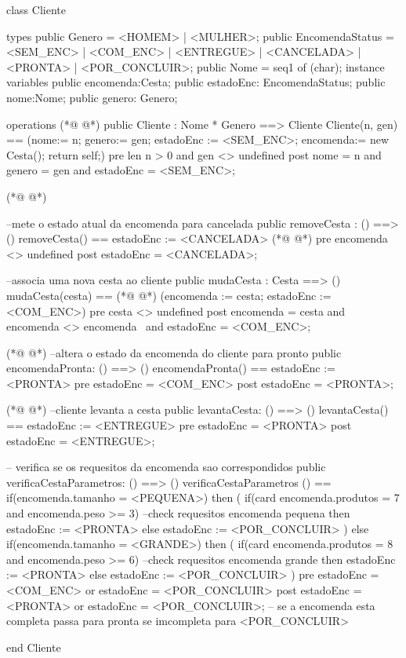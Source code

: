 \begin{vdmpp}[breaklines=true]
class Cliente

types 
 public Genero = <HOMEM> | <MULHER>;
 public EncomendaStatus = <SEM_ENC> | <COM_ENC> | <ENTREGUE> | <CANCELADA> | <PRONTA> | <POR_CONCLUIR>;
 public Nome = seq1 of (char);
instance variables
  public encomenda:Cesta;
  public estadoEnc: EncomendaStatus;
  public nome:Nome;
  public genero: Genero;

operations
(*@
\label{Cliente:14}
@*)
  public  Cliente : Nome * Genero ==> Cliente
  Cliente(n, gen) == (nome:= n; genero:= gen; estadoEnc := <SEM_ENC>; encomenda:= new Cesta(); return self;)
  pre len n > 0 and gen <> undefined
  post nome = n and genero = gen and estadoEnc = <SEM_ENC>;
  
(*@
\label{removeCesta:19}
@*)
  
  --mete o estado atual da encomenda para cancelada
  public  removeCesta : ()  ==> ()
  removeCesta() == estadoEnc := <CANCELADA>
(*@
\label{mudaCesta:23}
@*)
  pre encomenda <> undefined
  post estadoEnc = <CANCELADA>;
 
 --associa uma nova cesta ao cliente
  public  mudaCesta : Cesta ==> ()
  mudaCesta(cesta) ==
(*@
\label{encomendaPronta:29}
@*)
    (encomenda := cesta; estadoEnc := <COM_ENC>)
  pre cesta <> undefined
  post encomenda = cesta and encomenda <> encomenda~ and estadoEnc = <COM_ENC>;

 
(*@
\label{levantaCesta:34}
@*)
 --altera  o estado da encomenda do cliente para pronto
 public encomendaPronta: () ==> () 
 encomendaPronta() == estadoEnc := <PRONTA>
 pre estadoEnc = <COM_ENC>
 post estadoEnc = <PRONTA>;
 
(*@
\label{verificaCestaParametros:40}
@*)
  --cliente levanta a cesta 
 public levantaCesta: () ==> () 
 levantaCesta() == estadoEnc := <ENTREGUE>
 pre estadoEnc = <PRONTA> 
 post estadoEnc = <ENTREGUE>;
 
 
 -- verifica se os requesitos da encomenda sao correspondidos
 public verificaCestaParametros: () ==> ()
 verificaCestaParametros () ==
  if(encomenda.tamanho = <PEQUENA>)
   then (
    if(card encomenda.produtos = 7 and encomenda.peso >= 3) --check requesitos encomenda pequena
    then estadoEnc := <PRONTA>
    else  estadoEnc := <POR_CONCLUIR>
   )
   else if(encomenda.tamanho = <GRANDE>)
   then (
    if(card encomenda.produtos = 8 and encomenda.peso >= 6) --check requesitos encomenda grande
     then estadoEnc := <PRONTA>
     else estadoEnc := <POR_CONCLUIR>
   )
 pre estadoEnc = <COM_ENC> or estadoEnc = <POR_CONCLUIR>
 post estadoEnc = <PRONTA> or estadoEnc = <POR_CONCLUIR>; -- se a encomenda esta completa passa para pronta se imcompleta para <POR_CONCLUIR>
 
end Cliente
\end{vdmpp}
